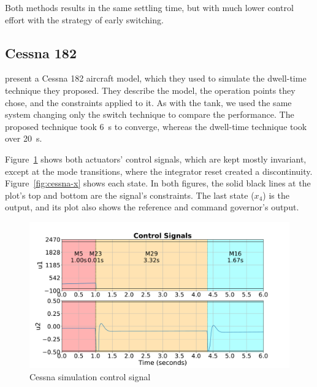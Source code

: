 Both methods results in the same settling time, but with much lower control
effort with the strategy of early switching.

\FloatBarrier

\subsection{Cessna 182}%
\label{subsec:cessna}

\textcite{franzè.lucia.ea:command} present a Cessna 182 aircraft model, which
they used to simulate the dwell-time technique they proposed. They describe the
model, the operation points they chose, and the constraints applied to it. As
with the tank, we used the same system changing only the switch technique to
compare the performance. The proposed technique took \SI{6}{\second} to
converge, whereas the dwell-time technique took over \SI{20}{\second}.

Figure~\ref{fig:cessna-u} shows both actuators' control signals, which are kept
mostly invariant, except at the mode transitions, where the integrator reset
created a discontinuity. Figure~\ref{fig:cessna-x} shows each state. In both
figures, the solid black lines at the plot's top and bottom are the signal's
constraints. The last state (\(x_{4}\)) is the output, and its plot also shows
the reference and command governor's output.

\begin{figure}[ht!]
  \centering \captionsetup{justification=centering}
  \includegraphics[height=0.3\textheight]{imgs/cessna-u}
  \caption{Cessna simulation control signal}%
  \label{fig:cessna-u}
\end{figure}

